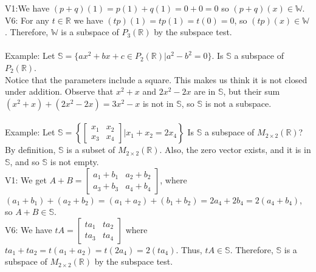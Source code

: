 \documentclass[10pt,letter]{article}
\begin{document}
V1:We have $(p+q)(1)=p(1)+q(1)=0+0=0$ so $(p+q)(x)\in\mathbb{W}$. \\ 
V6: For any $t\in\mathbb{R}$ we have $(tp)(1)=tp(1)=t(0)=0$, so $(tp)(x)\in\mathbb{W}$. Therefore, $\mathbb{W}$ is a subspace of $P_3(\mathbb{R})$ by the subspace test. \\ \\ 
Example: Let $\mathbb{S}=\{ax^2+bx+c\in P_2(\mathbb{R})|a^2-b^2=0\}$. Is $\mathbb{S}$ a subspace of $P_2(\mathbb{R})$. \\ 
Notice that the parameters include a square. This makes us think it is not closed under addition. Observe that $x^2+x$ and $2x^2-2x$ are in $\mathbb{S}$, but their sum $(x^2+x)+(2x^2-2x)=3x^2-x$ is not in $\mathbb{S}$, so $\mathbb{S}$ is not a subspace. \\ \\ 
Example: Let $\mathbb{S}=\left\{\begin{bmatrix}x_1&x_2\\x_3&x_4\end{bmatrix}|x_1+x_2=2x_4\right\}$ Is $\mathbb{S}$ a subspace of $M_{2\times 2}(\mathbb{R})$? \\ 
By definition, $\mathbb{S}$ is a subset of $M_{2\times 2}(\mathbb{R})$. Also, the zero vector exists, and it is in $\mathbb{S}$, and so $\mathbb{S}$ is not empty. \\ 
V1: We get $A+B = \begin{bmatrix}a_1+b_1&a_2+b_2\\a_3+b_3&a_4+b_4\end{bmatrix}$, where $(a_1+b_1)+(a_2+b_2)=(a_1+a_2)+(b_1+b_2)=2a_4+2b_4=2(a_4+b_4)$, so $A+B\in\mathbb{S}$. \\ 
V6: We have $tA=\begin{bmatrix}ta_1&ta_2\\ta_3&ta_4\end{bmatrix}$ where $ta_1+ta_2=t(a_1+a_2)=t(2a_4)=2(ta_4)$. Thus, $tA\in\mathbb{S}$. Therefore, $\mathbb{S}$ is a subspace of $M_{2\times2}(\mathbb{R})$ by the subspace test. 
\end{document}
